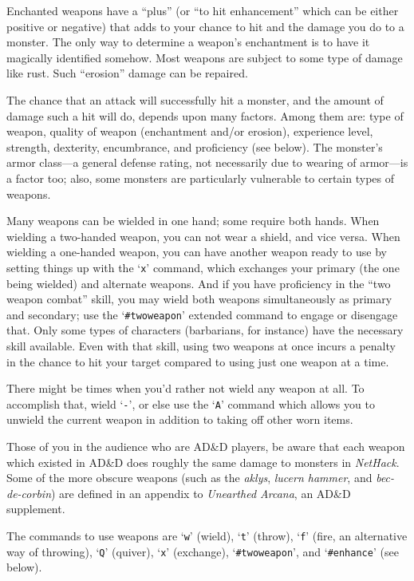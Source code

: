 Enchanted weapons have a ``plus'' (or ``to hit enhancement'' which can be
either positive or negative) that adds to your chance to
hit and the damage you do to a monster.  The only way to determine a weapon's
enchantment is to have it magically identified somehow.
Most weapons are subject to some type of damage like rust.  Such
``erosion'' damage can be repaired.

The chance that an attack will successfully hit a monster, and the amount
of damage such a hit will do, depends upon many factors.  Among them are:
type of weapon, quality of weapon (enchantment and/or erosion), experience
level, strength, dexterity, encumbrance, and proficiency (see below).  The
monster's armor class---a general defense rating, not necessarily due to
wearing of armor---is a factor too; also, some monsters are particularly
vulnerable to certain types of weapons.

Many weapons can be wielded in one hand; some require both hands.
When wielding a two-handed weapon, you can not wear a shield, and
vice versa.  When wielding a one-handed weapon, you can have another
weapon ready to use by setting things up with the `{\tt x}' command, which
exchanges your primary (the one being wielded) and alternate weapons.
And if you have proficiency in the ``two weapon combat'' skill, you
may wield both weapons simultaneously as primary and secondary; use the
`{\tt \#twoweapon}' extended command to engage or disengage that.  Only
some types of characters (barbarians, for instance) have the necessary
skill available.  Even with that skill, using two weapons at once incurs
a penalty in the chance to hit your target compared to using just one
weapon at a time.

There might be times when you'd rather not wield any weapon at all.
To accomplish that, wield `{\tt -}', or else use the `{\tt A}' command which
allows you to unwield the current weapon in addition to taking off
other worn items.

Those of you in the audience who are AD\&D players, be aware that each
weapon which existed in AD\&D does roughly the same damage to monsters in
{\it NetHack}.  Some of the more obscure weapons (such as the %
{\it aklys}, {\it lucern hammer}, and {\it bec-de-corbin\/}) are defined
in an appendix to {\it Unearthed Arcana}, an AD\&D supplement.

The commands to use weapons are `{\tt w}' (wield), `{\tt t}' (throw),
`{\tt f}' (fire, an alternative way of throwing), `{\tt Q}' (quiver),
`{\tt x}' (exchange), `{\tt \#twoweapon}', and `{\tt \#enhance}' (see below).

